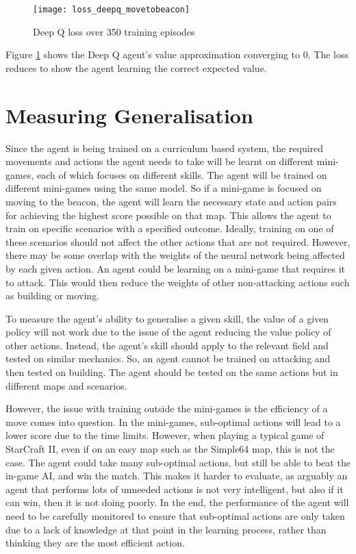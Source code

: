 \begin{figure}[h!]
    \centering
    \texttt{[image: loss\_deepq\_movetobeacon]}
    \caption{Deep Q loss over 350 training episodes}
    \label{fig:loss_deepq_movetobeacon}
\end{figure}


Figure \ref{fig:loss_deepq_movetobeacon} shows the Deep Q agent's value approximation converging to 0. The loss reduces to show the agent learning the correct expected value.

\section{Measuring Generalisation}

Since the agent is being trained on a curriculum based system, the required
movements and actions the agent needs to take will be learnt on different
mini-games, each of which focuses on different skills. The agent will be trained
on different mini-games using the same model. So if a mini-game is focused on
moving to the beacon, the agent will learn the necessary state and action pairs
for achieving the highest score possible on that map. This allows the agent to
train on specific scenarios with a specified outcome. Ideally, training on one
of these scenarios should not affect the other actions that are not required.
However, there may be some overlap with the weights of the neural network being affected
by each given action. An agent could be learning on a mini-game that requires
it to attack. This would then reduce the weights of other non-attacking actions
such as building or moving.

To measure the agent's ability to generalise a given skill, the value of
a given policy will not work due to the issue of the agent reducing the value
policy of other actions. Instead, the agent's skill should apply to the
relevant field and tested on similar mechanics. So, an agent cannot be trained
on attacking and then tested on building. The agent should be tested on the same
actions but in different maps and scenarios.

However, the issue with training outside the mini-games is the
efficiency of a move comes into question. In the mini-games, sub-optimal actions
will lead to a lower score due to the time limits. However, when playing a
typical game of StarCraft II, even if on an easy map such as the Simple64 map,
this is not the case. The agent could take many sub-optimal actions, but still
be able to beat the in-game AI, and win the match. This makes it harder to
evaluate, as arguably an agent that performs lots of unneeded actions is not very
intelligent, but also if it can win, then it is not doing poorly. In the
end, the performance of the agent will need to be carefully monitored to ensure
that sub-optimal actions are only taken due to a lack of knowledge at that point
in the learning process, rather than thinking they are the most efficient
action.
